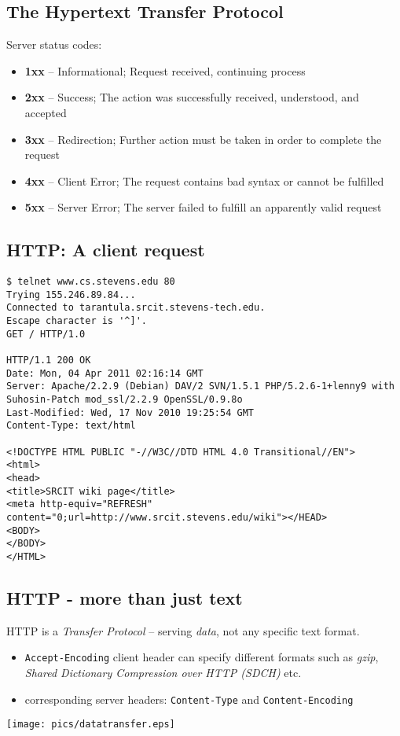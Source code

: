 \documentclass[xga]{xdvislides}
\begin{document}
\subsection{The Hypertext Transfer Protocol}
Server status codes:
\begin{itemize}
	\item {\bf 1xx} -- Informational; Request received, continuing process
	\item {\bf 2xx} -- Success; The action was successfully received,
        understood, and accepted
	\item {\bf 3xx} -- Redirection; Further action must be taken in order to
        complete the request
	\item {\bf 4xx} -- Client Error; The request contains bad syntax or
		cannot be fulfilled
	\item {\bf 5xx} -- Server Error; The server failed to fulfill an
		apparently valid request
\end{itemize}

\subsection{HTTP: A client request}
\newcommand{\smallish}{\fontsize{16}{16}\selectfont}
\smallish
\begin{center}
\begin{verbatim}
$ telnet www.cs.stevens.edu 80
Trying 155.246.89.84...
Connected to tarantula.srcit.stevens-tech.edu.
Escape character is '^]'.
GET / HTTP/1.0

HTTP/1.1 200 OK
Date: Mon, 04 Apr 2011 02:16:14 GMT
Server: Apache/2.2.9 (Debian) DAV/2 SVN/1.5.1 PHP/5.2.6-1+lenny9 with Suhosin-Patch mod_ssl/2.2.9 OpenSSL/0.9.8o
Last-Modified: Wed, 17 Nov 2010 19:25:54 GMT
Content-Type: text/html

<!DOCTYPE HTML PUBLIC "-//W3C//DTD HTML 4.0 Transitional//EN">
<html>
<head>
<title>SRCIT wiki page</title>
<meta http-equiv="REFRESH"
content="0;url=http://www.srcit.stevens.edu/wiki"></HEAD>
<BODY>
</BODY>
</HTML>
\end{verbatim}
\end{center}
\Normalsize

\subsection{HTTP - more than just text}
HTTP is a {\em Transfer Protocol} -- serving {\em data}, not any specific
text format.

\begin{itemize}
	\item {\tt Accept-Encoding} client header can specify different formats
		such as {\em gzip}, {\em Shared Dictionary Compression over HTTP (SDCH)} etc.
	\item corresponding server headers: {\tt Content-Type} and
		{\tt Content-Encoding}
\end{itemize}
\begin{center}
	\texttt{[image: pics/datatransfer.eps]}
\end{center}
\end{document}
